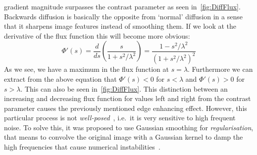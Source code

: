 gradient magnitude surpasses the contrast parameter as seen in~\ref{fig:DiffFlux}. Backwards
diffusion is basically the opposite from `normal' diffusion in a sense that it sharpens image
features instead of smoothing them.
If we look at the derivative of the flux function this will become more obvious:
\begin{equation}
    \Phi'(s) = \frac{d}{ds} \left(\frac{s}{1 + s^2/\lambda^2}\right) = 
    \frac{1 - s^2/\lambda^2}{{\left(1 + s^2/\lambda^2\right)}^2}
\end{equation}
As we see, we have a maximum in the flux function at $s = \lambda$. Furthermore we can extract from
the above equation that $\Phi'(s) < 0$ for $s < \lambda$ and $\Phi'(s) > 0$ for $s > \lambda$. This
can also be seen in~\ref{fig:DiffFlux}. This distinction between an increasing and decreasing flux
function for values left and right from the contrast parameter causes the previously mentioned
edge enhancing effect.\newpage\noindent
However, this particular process is not \textit{well-posed}~\cite{weickert96}, i.e.\ it is very
sensitive to high frequent noise. To solve this, it was proposed to use Gaussian smoothing for
\textit{regularisation}, that means to convolve the original image with a Gaussian kernel to damp the high
frequencies that cause numerical instabilities~\cite{catte-lions-morel92}.

